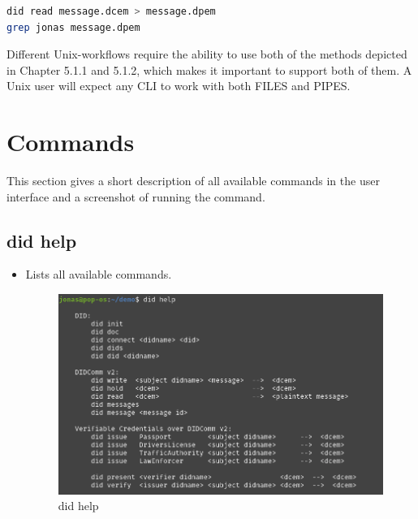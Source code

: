 \begin{lstlisting}[language=bash]
did read message.dcem > message.dpem
grep jonas message.dpem
\end{lstlisting}



\pagebreak



Different Unix-workflows require the ability to use both of the methods
depicted in Chapter 5.1.1 and 5.1.2, which makes it important to support
both of them. A Unix user will expect any CLI to work with both FILES
and PIPES.

\hypertarget{commands}{%
\section{Commands}\label{commands}}

This section gives a short description of all available commands in the
user interface and a screenshot of running the command.

\hypertarget{did-help}{%
\subsection{did help}\label{did-help}}

\begin{itemize}
\item
  Lists all available commands.

  \begin{figure}
  \centering
  \includegraphics[width=\textwidth]{User Interface f8759a9462b24d5f95cf6123d68b89ea/Untitled.png}
  \caption{did help}
  \end{figure}
\end{itemize}

